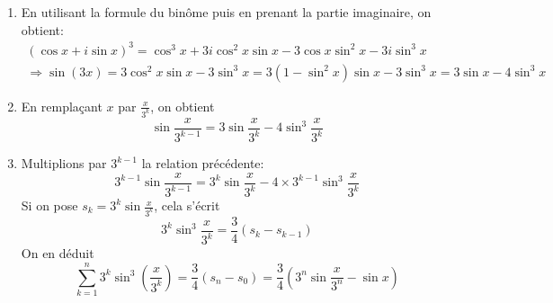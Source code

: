 \begin{enumerate}
  \item En utilisant la formule du binôme puis en prenant la partie imaginaire, on obtient:
\begin{multline*}
(\cos x + i \sin x)^3 = \cos^3 x +3 i\cos^2 x \sin x -3\cos x \sin^2 x -3i\sin^3 x\\
\Rightarrow
\sin(3x) = 3\cos^2x \sin x -3\sin^3x
= 3(1-\sin^2 x)\sin x  -3\sin^3x = 3\sin x -4\sin^3 x
\end{multline*}
\item En remplaçant $x$ par $\frac{x}{3^k}$, on obtient
\begin{displaymath}
  \sin \frac{x}{3^{k-1}} = 3 \sin\frac{x}{3^k} -4\sin^3\frac{x}{3^k}
\end{displaymath}
\item Multiplions par $3^{k-1}$ la relation précédente:
\begin{displaymath}
  3^{k-1}\sin \frac{x}{3^{k-1}} = 3^k \sin\frac{x}{3^k} -4\times3^{k-1}\sin^3\frac{x}{3^k}
\end{displaymath}
Si on pose $s_k =3^k\sin\frac{x}{3^k}$, cela s'écrit
\begin{displaymath}
  3^k \sin^3\frac{x}{3^k} = \frac{3}{4}(s_k -s_{k-1})
\end{displaymath}
On en déduit
\begin{displaymath}
  \sum_{k=1}^n 3^{k}\sin^3(\frac{x}{3^{k}})
  = \frac{3}{4}(s_n -s_0) = \frac{3}{4}(3^n\sin\frac{x}{3^n} -\sin x) 
\end{displaymath}

\end{enumerate}
